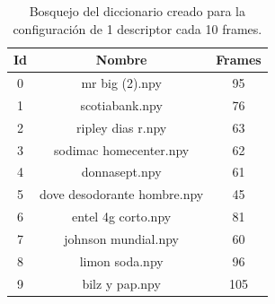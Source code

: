 \documentclass[14pt,letterpaper,hidelinks]{extarticle}
\begin{document}
\begin{table}[ht!]
\centering
\begin{tabular}{@{}ccc@{}}
\toprule
Id & Nombre                      & Frames \\ \midrule
0  & mr big (2).npy              & 95     \\
1  & scotiabank.npy              & 76     \\
2  & ripley dias r.npy           & 63     \\
3  & sodimac homecenter.npy      & 62     \\
4  & donnasept.npy               & 61     \\
5  & dove desodorante hombre.npy & 45     \\
6  & entel 4g corto.npy          & 81     \\
7  & johnson mundial.npy         & 60     \\
8  & limon soda.npy              & 96     \\
9  & bilz y pap.npy              & 105    \\ \bottomrule
\end{tabular}
\captionsetup{justification=centering,margin=2cm}
\caption{Bosquejo del diccionario creado para la configuración de 1 descriptor cada 10 frames. \label{tab:dict}}
\end{table}
\end{document}
